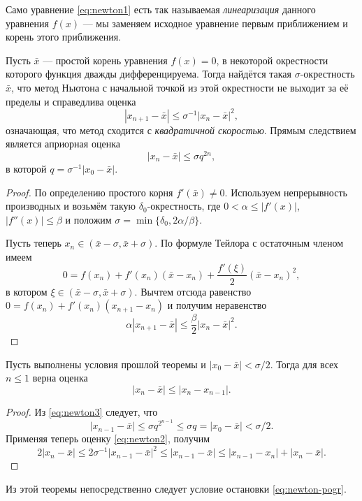 Само уравнение \eqref{eq:newton1} есть так называемая \emph{линеаризация}
данного уравнения $ f(x) $ --- мы заменяем исходное уравнение первым
приближением и корень этого приближения.

\begin{theorem}
  Пусть $ \bar x $ --- простой корень уравнения $ f(x) = 0$, в некоторой
  окрестности которого функция дважды дифференцируема. Тогда найдётся такая $
  \sigma $-окрестность $ \bar x $, что метод Ньютона с начальной точкой из этой
  окрестности не выходит за её пределы и справедлива оценка 
  \begin{equation}\label{eq:newton2}
    |x_{n+1} - \bar x| \leqslant \sigma^{-1}|x_n - \bar x|^2,
  \end{equation}
  означающая, что метод сходится с \emph{квадратичной скоростью}.
  Прямым следствием является априорная оценка  
  \begin{equation}\label{eq:newton3}
    |x_n - \bar x| \leqslant \sigma q^{2n},
  \end{equation}
  в которой $ q =\sigma^{-1}|x_0 - \bar x| $.
\end{theorem}
\begin{proof}
  По определению простого корня $ f'(\bar x) \neq 0 $. Используем непрерывность
  производных и возьмём такую $ \delta_0 $-окрестность, где $ 0 < \alpha
  \leqslant |f'(x)| $, $ |f''(x)| \leqslant \beta $ и положим $ \sigma =
  \min\{\delta_0, 2\alpha/\beta\} $. 

  Пусть теперь $ x_n \in (\bar x - \sigma, \bar x + \sigma) $. По формуле
  Тейлора с остаточным членом имеем  
  \[
      0 = f(x_n) + f'(x_n)(\bar x - x_n) + \frac{f'(\xi)}{2}(\bar x - x_n)^2,
  \]
 в котором $ \xi \in (\bar x - \sigma, \bar x + \sigma) $. Вычтем отсюда
 равенство $ 0 = f(x_n) + f'(x_n)(x_{n+1} - x_n) $ и получим неравенство 
 \[
   \alpha|x_{n+1} - \bar x| \leqslant  \frac{\beta}{2}|x_n - \bar x|^2.
 \]
\end{proof}

\begin{theorem}
  Пусть выполнены условия прошлой теоремы и $ |x_0 - \bar x| < \sigma/2 $. Тогда
  для всех $ n \leqslant 1 $ верна оценка  
  \[
    |x_n - \bar x| \leqslant |x_n - x_{n-1}|.
  \] 
\end{theorem}
\begin{proof}
  Из \eqref{eq:newton3} следует, что  
  \[
    |x_{n-1} - \bar x| \leqslant \sigma q^{2^{n-1}} \leqslant \sigma q = |x_0 -
    \bar x| < \sigma/2.
  \]
  Применяя теперь оценку \eqref{eq:newton2}, получим  
  \[
    2|x_n - \bar x| \leqslant 2\sigma^{-1}|x_{n-1} - \bar x|^2 \leqslant
    |x_{n-1} - \bar x| \leqslant |x_{n-1} - x_n| + |x_n - \bar x|.
  \]
\end{proof}
Из этой теоремы непосредственно следует условие остановки
\eqref{eq:newton-pogr}.


